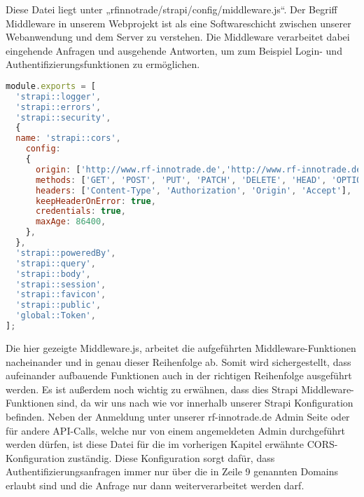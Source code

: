 Diese Datei liegt unter „rfinnotrade/strapi/config/middleware.js“.
Der Begriff Middleware in unserem Webprojekt ist als eine Softwareschicht zwischen unserer Webanwendung und dem Server zu verstehen. Die Middleware verarbeitet dabei eingehende Anfragen und ausgehende Antworten, um zum Beispiel Login- und Authentifizierungsfunktionen zu ermöglichen.

\begin{lstlisting}[language=JavaScript, caption={Middlewares.js}, label={lst:middlewaresjs}]
module.exports = [
  'strapi::logger',
  'strapi::errors',
  'strapi::security',
  {
  name: 'strapi::cors',
    config: 
    {
      origin: ['http://www.rf-innotrade.de','http://www.rf-innotrade.de:82', 'http://www.rf-innotrade.de:1338'],
      methods: ['GET', 'POST', 'PUT', 'PATCH', 'DELETE', 'HEAD', 'OPTIONS'],
      headers: ['Content-Type', 'Authorization', 'Origin', 'Accept'],
      keepHeaderOnError: true,
      credentials: true,
      maxAge: 86400,
    },
  },
  'strapi::poweredBy',
  'strapi::query',
  'strapi::body',
  'strapi::session',
  'strapi::favicon',
  'strapi::public',
  'global::Token',
];
\end{lstlisting}

Die hier gezeigte Middleware.js, arbeitet die aufgeführten Middleware-Funktionen nacheinander und in genau dieser Reihenfolge ab. Somit wird sichergestellt, dass aufeinander aufbauende Funktionen auch in der richtigen Reihenfolge ausgeführt werden. Es ist außerdem noch wichtig zu erwähnen, dass dies Strapi Middleware-Funktionen sind, da wir uns nach wie vor innerhalb unserer Strapi Konfiguration befinden.
Neben der Anmeldung unter unserer rf-innotrade.de Admin Seite oder für andere API-Calls, welche nur von einem angemeldeten Admin durchgeführt werden dürfen, ist diese Datei für die im vorherigen Kapitel erwähnte CORS-Konfiguration zuständig.
Diese Konfiguration sorgt dafür, dass Authentifizierungsanfragen immer nur über die in Zeile 9 genannten Domains erlaubt sind und die Anfrage nur dann weiterverarbeitet werden darf.
